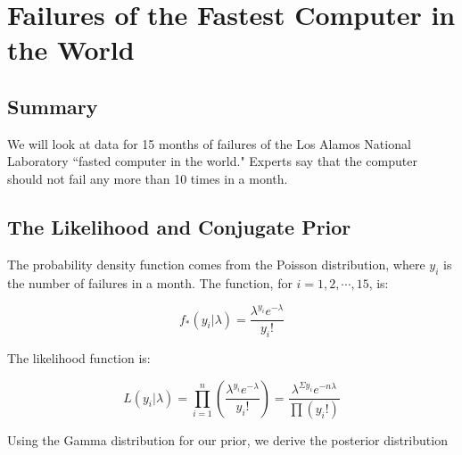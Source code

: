 \documentclass[12pt]{article}
\begin{document}
\newpage

\section{Failures of the Fastest Computer in the World}

\subsection{Summary}

\noindent We will look at data for 15 months of failures of the Los Alamos National Laboratory ``fasted computer in the world."  Experts say that the computer should not fail any more than 10 times in a month.

\subsection{The Likelihood and Conjugate Prior}

The probability density function comes from the Poisson distribution, where $y_i$ is the number of failures in a month.  The function, for $i=1,2,\cdots,15$, is:

\[f_*(y_i|\lambda)=\frac{\lambda^{y_i}e^{-\lambda}}{y_i!} \]

\noindent The likelihood function is:

\[L(y_i|\lambda) = \prod_{i=1}^n\left(\frac{\lambda^{y_i}e^{-\lambda}}{y_i!}\right) = \frac{\lambda^{\Sigma y_i}e^{-n\lambda}}{\prod (y_i!)}\]



\noindent Using the Gamma distribution for our prior, we derive the posterior distribution
\end{document}
